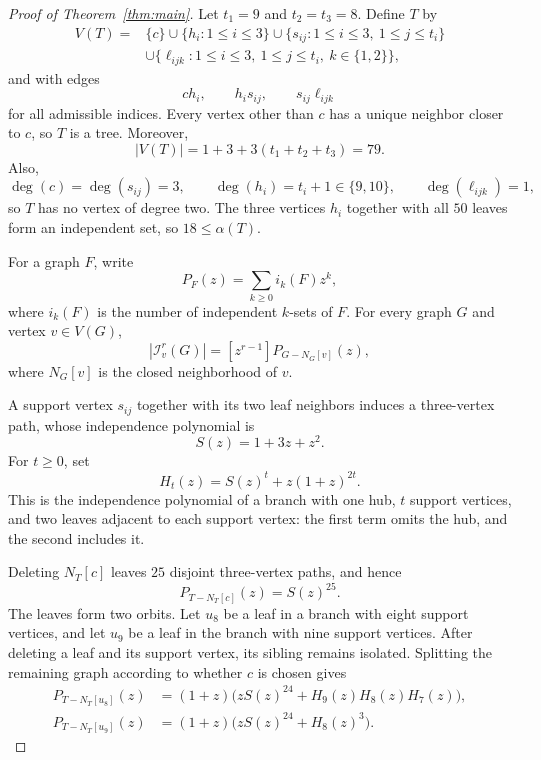 \documentclass[11pt]{amsart}
\newcommand{\I}{\mathcal I}
\begin{document}
\begin{proof}[Proof of Theorem~\ref{thm:main}]
Let $t_1=9$ and $t_2=t_3=8$. Define $T$ by
\[
\begin{aligned}
V(T)={}&\{c\}\cup\{h_i:1\le i\le3\}
\cup\{s_{ij}:1\le i\le3,\ 1\le j\le t_i\}\\
&\cup\{\ell_{ijk}:1\le i\le3,\ 1\le j\le t_i,\ k\in\{1,2\}\},
\end{aligned}
\]
and with edges
\[
ch_i,\qquad h_is_{ij},\qquad s_{ij}\ell_{ijk}
\]
for all admissible indices. Every vertex other than $c$ has a unique
neighbor closer to $c$, so $T$ is a tree. Moreover,
\[
|V(T)|=1+3+3(t_1+t_2+t_3)=79.
\]
Also,
\[
\deg(c)=\deg(s_{ij})=3,\qquad
\deg(h_i)=t_i+1\in\{9,10\},\qquad
\deg(\ell_{ijk})=1,
\]
so $T$ has no vertex of degree two. The three vertices $h_i$ together with
all $50$ leaves form an independent set, so $18\le\alpha(T)$.

For a graph $F$, write
\[
P_F(z)=\sum_{k\ge0}i_k(F)z^k,
\]
where $i_k(F)$ is the number of independent $k$-sets of $F$. For every graph
$G$ and vertex $v\in V(G)$,
\begin{equation}\label{eq:star}
|\I_v^r(G)|=[z^{r-1}]P_{G-N_G[v]}(z),
\end{equation}
where $N_G[v]$ is the closed neighborhood of $v$.

A support vertex $s_{ij}$ together with its two leaf neighbors induces a
three-vertex path, whose independence polynomial is
\[
S(z)=1+3z+z^2.
\]
For $t\ge0$, set
\[
H_t(z)=S(z)^t+z(1+z)^{2t}.
\]
This is the independence polynomial of a branch with one hub, $t$ support
vertices, and two leaves adjacent to each support vertex: the first term
omits the hub, and the second includes it.

Deleting $N_T[c]$ leaves $25$ disjoint three-vertex paths, and hence
\begin{equation}\label{eq:center}
P_{T-N_T[c]}(z)=S(z)^{25}.
\end{equation}
The leaves form two orbits. Let $u_8$ be a leaf in a branch with eight
support vertices, and let $u_9$ be a leaf in the branch with nine support
vertices. After deleting a leaf and its support vertex, its sibling remains
isolated. Splitting the remaining graph according to whether $c$ is chosen
gives
\begin{align}
P_{T-N_T[u_8]}(z)
  &=(1+z)\bigl(zS(z)^{24}+H_9(z)H_8(z)H_7(z)\bigr),
    \label{eq:leaf8}\\
P_{T-N_T[u_9]}(z)
  &=(1+z)\bigl(zS(z)^{24}+H_8(z)^3\bigr).
    \label{eq:leaf9}
\end{align}


\end{proof}
\end{document}
